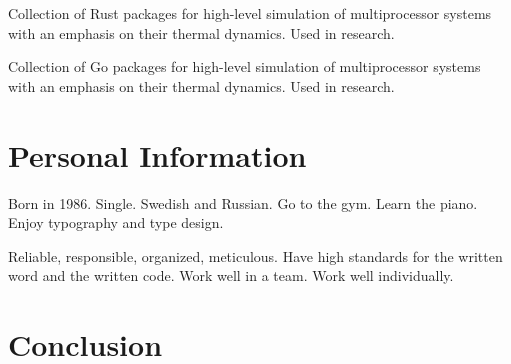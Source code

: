 \documentclass[journal]{IEEEtran}
\begin{document}
\emph{}

Collection of Rust packages for high-level simulation of multiprocessor systems
with an emphasis on their thermal dynamics. Used in research.

\emph{}

Collection of Go packages for high-level simulation of multiprocessor systems
with an emphasis on their thermal dynamics. Used in research.

\section{Personal Information}

Born in 1986. Single. Swedish and Russian. Go to the gym.
 Learn the piano.
Enjoy typography and type design.

Reliable, responsible, organized, meticulous. Have high standards for the
written word and the written code. Work well in a team. Work well individually.

\section{Conclusion}

\begingroup
  
  
\endgroup
\end{document}
